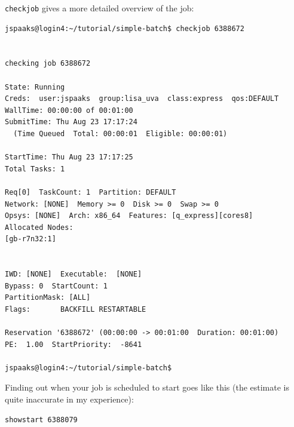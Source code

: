 \lstinline[style=bashinline]{checkjob} gives a more detailed overview of the job:
\begin{lstlisting}[style=basic,style=bash]
jspaaks@login4:~/tutorial/simple-batch$ checkjob 6388672


checking job 6388672

State: Running
Creds:  user:jspaaks  group:lisa_uva  class:express  qos:DEFAULT
WallTime: 00:00:00 of 00:01:00
SubmitTime: Thu Aug 23 17:17:24
  (Time Queued  Total: 00:00:01  Eligible: 00:00:01)

StartTime: Thu Aug 23 17:17:25
Total Tasks: 1

Req[0]  TaskCount: 1  Partition: DEFAULT
Network: [NONE]  Memory >= 0  Disk >= 0  Swap >= 0
Opsys: [NONE]  Arch: x86_64  Features: [q_express][cores8]
Allocated Nodes:
[gb-r7n32:1]


IWD: [NONE]  Executable:  [NONE]
Bypass: 0  StartCount: 1
PartitionMask: [ALL]
Flags:       BACKFILL RESTARTABLE

Reservation '6388672' (00:00:00 -> 00:01:00  Duration: 00:01:00)
PE:  1.00  StartPriority:  -8641

jspaaks@login4:~/tutorial/simple-batch$ 
\end{lstlisting}

Finding out when your job is scheduled to start goes like this (the estimate is quite inaccurate in my experience):
\begin{lstlisting}[style=basic,style=bash]
showstart 6388079
\end{lstlisting}

\vspace{1em}


